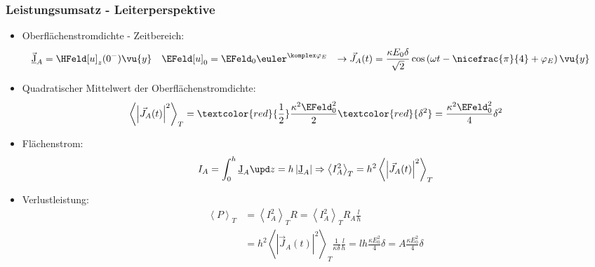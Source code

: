 \begin{frame}
   \frametitle{Leistungsumsatz - Leiterperspektive}
\begin{itemize}[<+->]
\item Oberflächenstromdichte - Zeitbereich:
  \begin{align*}
    \vec{\underbar{J}}_A & =\HFeld[u]_z(0^-) \vu{y} \quad \EFeld[u]_{0} = \EFeld_{0} \euler^{\komplex\varphi_E}  & \to \vec{J}_A(t) & = \frac{\kappa E_0 \delta}{\sqrt{2}}  \cos\left( \omega t -\nicefrac{\pi}{4} +\varphi_E \right) \vu{y}
  \end{align*}
\item Quadratischer Mittelwert der Oberflächenstromdichte:
  $$\left\langle \left| \vec{J}_A(t) \right|^2  \right\rangle_T  = \textcolor{red}{\frac{1}{2}} \frac{\kappa^2\EFeld_0^2}{2} \textcolor{red}{\delta^2} = \frac{\kappa^2\EFeld_0^2}{4} \delta^2 
  $$
\item Flächenstrom:
  $$
  I_A=\int_0^h \underbar{J}_A  \upd z = h \left|\underbar{J}_A\right| \Rightarrow \left\langle I_A^2 \right\rangle_T = h^2 \left\langle \left| \vec{J}_A(t) \right|^2  \right\rangle_T  
  $$
\item Verlustleistung:
  \begin{align*}
    \left\langle P\right\rangle_T &= \left\langle I_A^2 \right\rangle_T R = \left\langle I_A^2 \right\rangle_T R_A \frac{l}{h} \\
    &= h^2 \left\langle \left| \vec{J}_A(t) \right|^2  \right\rangle_T \frac{1}{\kappa\delta} \frac{l}{h} = l h \frac{\kappa E_0^2}{4} \delta = A \frac{\kappa E_0^2}{4} \delta
    \end{align*}
 \end{itemize}
\end{frame}


